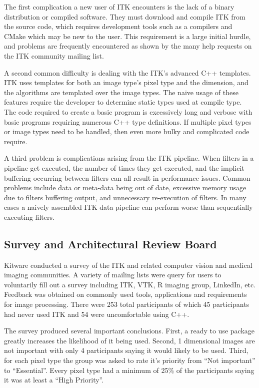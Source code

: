 \documentclass{frontiersMED} %
\begin{document}
The first complication a new user of ITK encounters is the lack of a
binary distribution or compiled software. They must download and
compile ITK from the source code, which requires development tools
such as a compilers and CMake which may be new to the user. This
requirement is a large initial hurdle, and problems are frequently
encountered as shown by the many help requests on the ITK community
mailing list.

A second common difficulty is dealing with the ITK's advanced C++
templates. ITK uses templates for both an image type's pixel type and
the dimension, and the algorithms are templated over the image
types. The naive usage of these features require the developer to
determine static types used at compile type.  The code required to
create a basic program is excessively long and verbose with basic
programs requiring numerous C++ type definitions.  If multiple pixel
types or image types need to be handled, then even more bulky and
complicated code require.

A third problem is complications arising from the ITK pipeline. When
filters in a pipeline get executed, the number of times they get
executed, and the implicit buffering occurring between filters can all
result in performance issues. Common problems include data or
meta-data being out of date, excessive memory usage due to filters
buffering output, and unnecessary re-execution of filters. In many
cases a naively assembled ITK data pipeline can perform worse than
sequentially executing filters.


\subsection {Survey and Architectural Review Board}
Kitware conducted a survey of the ITK and related computer vision and
medical imaging communities. A variety of mailing lists were query for
users to voluntarily fill out a survey including ITK, VTK, R imaging
group, LinkedIn, etc. Feedback was obtained on commonly used tools,
applications and requirements for image processing. There were 253
total participants of which 45 participants had never used ITK and 54
were uncomfortable using C++.

The survey produced several important conclusions. First, a ready to
use package greatly increases the likelihood of it being used. Second,
1 dimensional images are not important with only 4 participants saying
it would likely to be used. Third, for each pixel type the group was
asked to rate it's priority from ``Not important'' to ``Essential''. Every
pixel type had a minimum of 25\% of the participants saying it was at least
a ``High Priority''.
\end{document}
